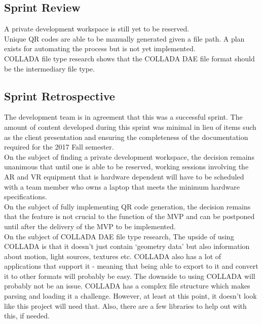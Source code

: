     \subsection{Sprint Review}
    \label{sec:Sprint5_review}
        \hspace{7mm}
        A private development workspace is still yet to be reserved.\\

        Unique QR codes are able to be manually generated given a file path.  A plan exists for automating
        the process but is not yet implemented.\\
        
        COLLADA file type research shows that the COLLADA DAE file format should be the intermediary file type.

    \subsection{Sprint Retrospective}
    \label{sec:Sprint5_retrospective}
        \hspace{7mm}
        The development team is in agreement that this was a successful sprint.  The amount of
        content developed during this sprint was minimal in lieu of items such as the client 
        presentation and ensuring the completeness of the documentation required for the 2017
        Fall semester.\\
        
        On the subject of finding a private development workspace, the decision remains unanimous that until one 
        is able to be reserved, working sessions involving the AR and VR equipment that is hardware dependent 
        will have to be scheduled with a team member who owns a laptop that meets the minimum hardware
        specifications.\\

        On the subject of fully implementing QR code generation, the decision remains that 
        the feature is not crucial to the function of the MVP and can be postponed until after the delivery
        of the MVP to be implemented.\\

        On the subject of COLLADA DAE file type research, The upside of using COLLADA is that it doesn't just 
        contain `geometry data' but also information about motion, light sources, textures etc. COLLADA also 
        has a lot of applications that support it - meaning that being able to export to it and convert it to 
        other formats will probably be easy. The downside to using COLLADA will probably not be an issue. 
        COLLADA has a complex file structure which makes parsing and loading it a challenge. However, at least 
        at this point, it doesn't look like this project will need that. Also, there are a few libraries to 
        help out with this, if needed.\\
